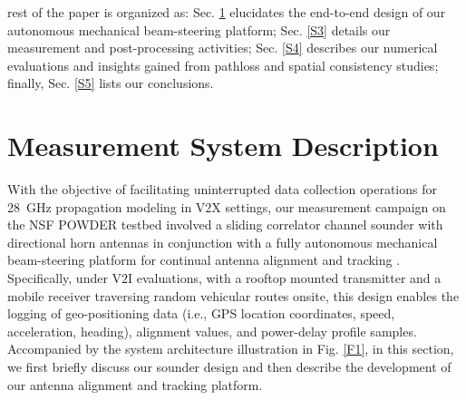 \documentclass[10pt, twocolumn]{IEEEtran}
\begin{document}
 rest of the paper is organized as: Sec. \ref{S2} elucidates the end-to-end design of our autonomous mechanical beam-steering platform; Sec. \ref{S3} details our measurement and post-processing activities; Sec. \ref{S4} describes our numerical evaluations and insights gained from pathloss and spatial consistency studies; finally, Sec. \ref{S5} lists our conclusions.
\vspace{-3mm}

\section{Measurement System Description}\label{S2}
With the objective of facilitating uninterrupted data collection operations for \SI{28}{\giga\hertz} propagation modeling in V$2$X settings, our measurement campaign on the NSF POWDER testbed \cite{POWDER} involved a sliding correlator channel sounder \cite{Sounder} with directional horn antennas in conjunction with a fully autonomous mechanical beam-steering platform for continual antenna alignment and tracking \cite{NRSM}. Specifically, under V$2$I evaluations, with a rooftop mounted transmitter and a mobile receiver traversing random vehicular routes onsite, this design enables the logging of geo-positioning data (i.e., GPS location coordinates, speed, acceleration, heading), alignment values, and power-delay profile samples. Accompanied by the system architecture illustration in Fig. \ref{F1}, in this section, we first briefly discuss our sounder design and then describe the development of our antenna alignment and tracking platform.
\end{document}
